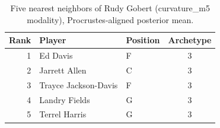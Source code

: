 \begin{table}[htbp]
  \centering\small
  \begin{tabular}{rllc}
    \toprule
    Rank & Player & Position & Archetype \\
    \midrule
    1 & Ed Davis & F & 3 \\
    2 & Jarrett Allen & C & 3 \\
    3 & Trayce Jackson-Davis & F & 3 \\
    4 & Landry Fields & G & 3 \\
    5 & Terrel Harris & G & 3 \\
    \bottomrule
  \end{tabular}
  \caption{Five nearest neighbors of Rudy Gobert (curvature_m5 modality), Procrustes-aligned posterior mean.}
  \label{tab:Rudy_Gobert_neighbors_curvature_m5}
\end{table}

